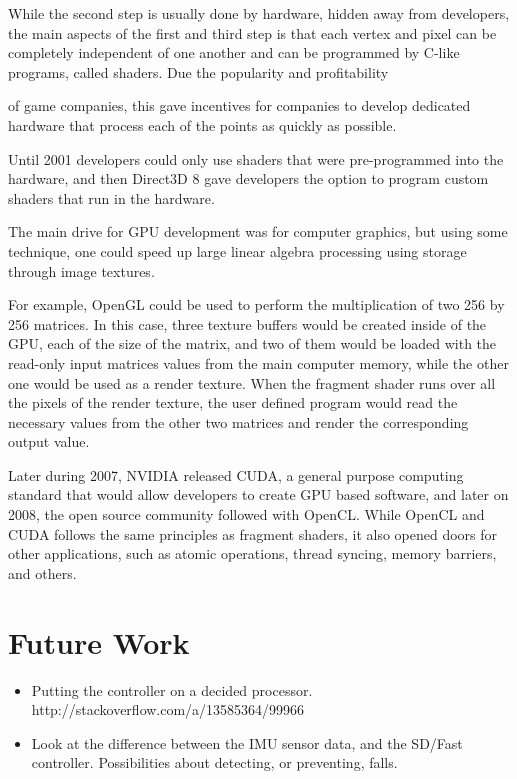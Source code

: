 \documentclass[12pt]{report}
\begin{document}
While the second step is usually done by hardware, hidden away from developers, the main aspects of the first and third step is that each vertex and pixel can be completely independent of one another and can be programmed by C-like programs, called shaders. Due the popularity and profitability

of game companies, this gave incentives for companies to develop dedicated hardware that process each of the points as quickly as possible.

Until 2001 developers could only use shaders that were pre-programmed into the hardware, and then Direct3D 8 \cite{wiki:direct3d} gave developers the option to program custom shaders that run in the hardware.

The main drive for GPU development was for computer graphics, but using some technique, one could speed up large linear algebra processing using storage through image textures. \cite{Goeddeke:2005:GBM}

For example, OpenGL could be used to perform the multiplication of two 256 by 256 matrices. In this case, three texture buffers would be created inside of the GPU, each of the size of the matrix, and two of them would be loaded with the read-only input matrices values from the main computer memory, while the other one would be used as a render texture. When the fragment shader runs over all the pixels of the render texture, the user defined program would read the necessary values from the other two matrices and render the corresponding output value. 

Later during 2007, NVIDIA released CUDA, a general purpose computing standard that would allow developers to create GPU based software, and later on 2008, the open source community followed with OpenCL. While OpenCL and CUDA follows the same principles as fragment shaders, it also opened doors for other applications, such as atomic operations, thread syncing, memory barriers, and others.

\section{Future Work}

\begin{itemize}
\item Putting the controller on a decided processor. http://stackoverflow.com/a/13585364/99966 
\item Look at the difference between the IMU sensor data, and the SD/Fast controller. Possibilities about detecting, or preventing, falls. 
\end{itemize}
\end{document}

